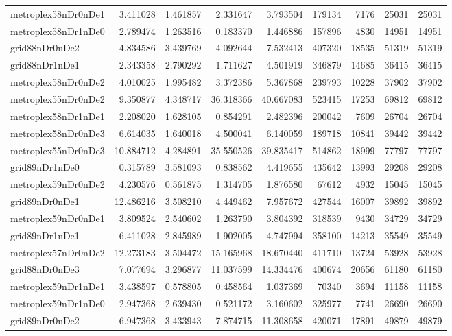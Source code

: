 \begin{longtable}{|l|r|r|r|r|r|r|r|r|}
metroplex58nDr0nDe1 & 3.411028 & 1.461857 & 2.331647 & 3.793504 & 179134 & 7176 & 25031 & 25031 \\
metroplex58nDr1nDe0 & 2.789474 & 1.263516 & 0.183370 & 1.446886 & 157896 & 4830 & 14951 & 14951 \\
grid88nDr0nDe2 & 4.834586 & 3.439769 & 4.092644 & 7.532413 & 407320 & 18535 & 51319 & 51319 \\
grid88nDr1nDe1 & 2.343358 & 2.790292 & 1.711627 & 4.501919 & 346879 & 14685 & 36415 & 36415 \\
metroplex58nDr0nDe2 & 4.010025 & 1.995482 & 3.372386 & 5.367868 & 239793 & 10228 & 37902 & 37902 \\
metroplex55nDr0nDe2 & 9.350877 & 4.348717 & 36.318366 & 40.667083 & 523415 & 17253 & 69812 & 69812 \\
metroplex58nDr1nDe1 & 2.208020 & 1.628105 & 0.854291 & 2.482396 & 200042 & 7609 & 26704 & 26704 \\
metroplex58nDr0nDe3 & 6.614035 & 1.640018 & 4.500041 & 6.140059 & 189718 & 10841 & 39442 & 39442 \\
metroplex55nDr0nDe3 & 10.884712 & 4.284891 & 35.550526 & 39.835417 & 514862 & 18999 & 77797 & 77797 \\
grid89nDr1nDe0 & 0.315789 & 3.581093 & 0.838562 & 4.419655 & 435642 & 13993 & 29208 & 29208 \\
metroplex59nDr0nDe2 & 4.230576 & 0.561875 & 1.314705 & 1.876580 & 67612 & 4932 & 15045 & 15045 \\
grid89nDr0nDe1 & 12.486216 & 3.508210 & 4.449462 & 7.957672 & 427544 & 16007 & 39892 & 39892 \\
metroplex59nDr0nDe1 & 3.809524 & 2.540602 & 1.263790 & 3.804392 & 318539 & 9430 & 34729 & 34729 \\
grid89nDr1nDe1 & 6.411028 & 2.845989 & 1.902005 & 4.747994 & 358100 & 14213 & 35549 & 35549 \\
metroplex57nDr0nDe2 & 12.273183 & 3.504472 & 15.165968 & 18.670440 & 411710 & 13724 & 53928 & 53928 \\
grid88nDr0nDe3 & 7.077694 & 3.296877 & 11.037599 & 14.334476 & 400674 & 20656 & 61180 & 61180 \\
metroplex59nDr1nDe1 & 3.438597 & 0.578805 & 0.458564 & 1.037369 & 70340 & 3694 & 11158 & 11158 \\
metroplex59nDr1nDe0 & 2.947368 & 2.639430 & 0.521172 & 3.160602 & 325977 & 7741 & 26690 & 26690 \\
grid89nDr0nDe2 & 6.947368 & 3.433943 & 7.874715 & 11.308658 & 420071 & 17891 & 49879 & 49879 \\

\end{longtable}
